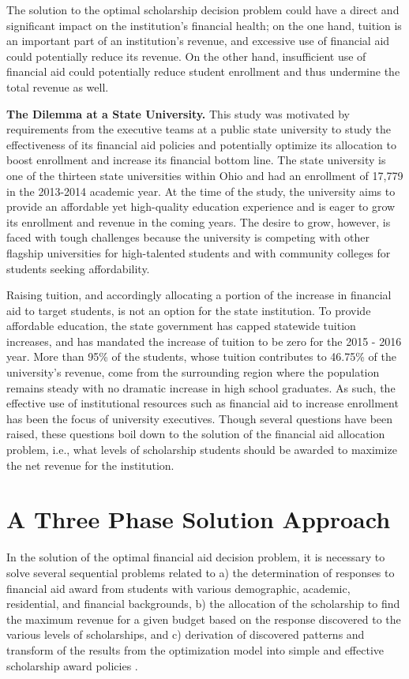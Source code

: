 \documentclass[12pt,english]{report}
\begin{document}
The solution to the optimal scholarship decision problem could have a direct and significant impact on the institution's financial health; on the one hand, tuition is an important part of an institution's revenue, and excessive use of financial aid could potentially reduce its revenue. On the other hand, insufficient use of financial aid could potentially reduce student enrollment and thus undermine the total revenue as well. 

\vspace*{.15in} 
\noindent \textbf{The Dilemma at a State University.} This study was  motivated by requirements from the executive teams at a public state  university to study the effectiveness of its financial aid policies  and potentially optimize its allocation to boost enrollment and  increase its financial bottom line.   The state university is one of the thirteen state universities  within Ohio and had an enrollment of 17,779  in the 2013-2014 academic year. At the time of the study, the university aims to provide an affordable yet high-quality education experience and is eager to grow its enrollment and revenue in the  coming years.  The desire to grow, however, is faced with tough 
challenges because the university is competing with other flagship  universities for high-talented students and with community colleges  for students seeking affordability.

Raising tuition, and accordingly allocating a portion of the increase in financial aid to target students, is not an option for the state institution. To provide affordable education, the state government has capped statewide tuition increases, and has mandated the increase of tuition to be zero for the 2015 - 2016 year. More than 95\% of the students, whose tuition contributes to 46.75\% of the university's revenue, come from the surrounding region where the population remains steady with no dramatic increase in high school graduates. As such, the effective use of institutional resources such as financial aid to increase enrollment has been the focus of university executives. Though several questions have been raised, these questions boil down to the solution of the financial aid allocation problem, i.e., what levels of scholarship students should be awarded to maximize the net revenue for the institution.

\section{A Three Phase Solution Approach}
In the solution of the optimal financial aid decision problem,  it is necessary to solve several sequential problems related to a) the determination of responses to financial aid award from students with various demographic, academic, residential, and financial backgrounds, b) the allocation of the scholarship to find the maximum revenue for a given budget based on the response discovered to the various levels of scholarships, and c) derivation of discovered patterns and transform of the results from the optimization model into simple and effective scholarship award policies .
\end{document}
